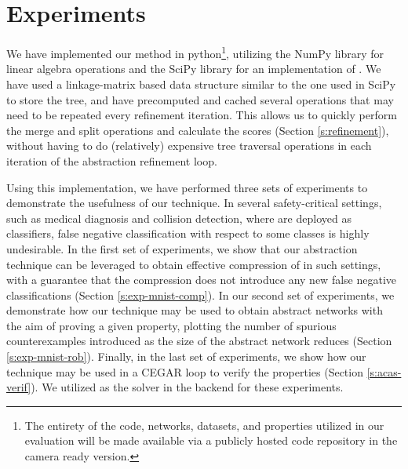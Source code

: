 \section{Experiments} 


We have implemented our method in python\footnote{The entirety of the code,
    networks, datasets, and properties utilized in our evaluation will be made
    available via a publicly hosted code repository in the
camera ready version.}, utilizing the NumPy
library for linear algebra operations and the SciPy
library for an
implementation of \hcluster.
We have used a linkage-matrix based
data structure similar to the one used in SciPy to store the tree, and have
precomputed and cached several
operations that may need to be repeated every refinement iteration. This allows
us to quickly perform the merge and split operations and calculate the
scores (Section \ref{s:refinement}), without having to do (relatively)
expensive tree traversal operations in each iteration of the abstraction
refinement loop. 

Using this implementation, we have performed three sets of experiments to
demonstrate the usefulness of our technique. In several safety-critical
settings, such as medical diagnosis and collision detection, where \dnn are
deployed as classifiers, false negative classification with respect to some
classes is highly undesirable. In the first set of experiments, we show that
our abstraction technique can be leveraged to obtain effective compression of
\dnn in such settings, with a guarantee that the compression does not introduce
any new false negative classifications (Section \ref{s:exp-mnist-comp}). In our
second set of experiments, we demonstrate how our technique may be used to
obtain abstract networks with the aim of proving a given property, plotting the
number of spurious counterexamples introduced as the size of the abstract
network reduces (Section \ref{s:exp-mnist-rob}). Finally, in the last set of
experiments, we show how our technique may be used in a CEGAR loop
\cite{cegar-nn} to verify the \acasxu properties (Section \ref{s:acas-verif}).
We utilized \abcrown as the solver in the backend for these experiments. 

